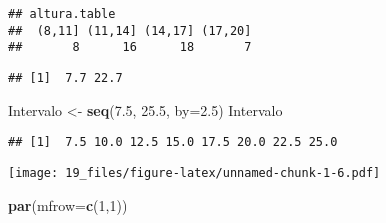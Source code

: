 \documentclass[
]{article}
\newenvironment{Shaded}{\begin{snugshade}}{\end{snugshade}}
\newcommand{\CommentTok}[1]{\textcolor[rgb]{0.56,0.35,0.01}{\textit{#1}}}
\newcommand{\DataTypeTok}[1]{\textcolor[rgb]{0.13,0.29,0.53}{#1}}
\newcommand{\DecValTok}[1]{\textcolor[rgb]{0.00,0.00,0.81}{#1}}
\newcommand{\FloatTok}[1]{\textcolor[rgb]{0.00,0.00,0.81}{#1}}
\newcommand{\KeywordTok}[1]{\textcolor[rgb]{0.13,0.29,0.53}{\textbf{#1}}}
\newcommand{\NormalTok}[1]{#1}
\newcommand{\OperatorTok}[1]{\textcolor[rgb]{0.81,0.36,0.00}{\textbf{#1}}}
\newcommand{\StringTok}[1]{\textcolor[rgb]{0.31,0.60,0.02}{#1}}
\begin{document}
\begin{verbatim}
## altura.table
##  (8,11] (11,14] (14,17] (17,20] 
##       8      16      18       7
\end{verbatim}

\begin{Shaded}
\end{Shaded}

\begin{verbatim}
## [1]  7.7 22.7
\end{verbatim}

\begin{Shaded}
\begin{Highlighting}[]
\NormalTok{Intervalo <-}\StringTok{ }\KeywordTok{seq}\NormalTok{(}\FloatTok{7.5}\NormalTok{, }\FloatTok{25.5}\NormalTok{, }\DataTypeTok{by=}\FloatTok{2.5}\NormalTok{)}
\NormalTok{Intervalo}
\end{Highlighting}
\end{Shaded}

\begin{verbatim}
## [1]  7.5 10.0 12.5 15.0 17.5 20.0 22.5 25.0
\end{verbatim}

\begin{Shaded}
\end{Shaded}

\texttt{[image: 19\_files/figure-latex/unnamed-chunk-1-6.pdf]}

\begin{Shaded}
\begin{Highlighting}[]
\KeywordTok{par}\NormalTok{(}\DataTypeTok{mfrow=}\KeywordTok{c}\NormalTok{(}\DecValTok{1}\NormalTok{,}\DecValTok{1}\NormalTok{))}
\end{Highlighting}
\end{Shaded}
\end{document}

